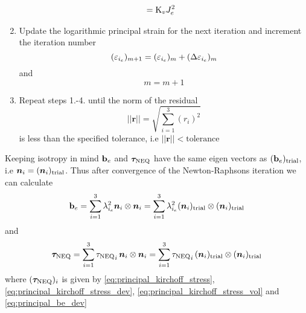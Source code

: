 \begin{enumerate}
\begin{align}
        &= \mathrm{K}_{v} J_{e}^{2} \label{eq:diff_prtauneqvol}
    \end{align}
    \item Update the logarithmic principal strain for the next iteration and increment the iteration number
    \begin{equation}
        (\varepsilon_{{i}_e})_{m+1} = (\varepsilon_{{i}_e})_{m} + (\Delta \varepsilon_{{i}_e})_{m}
        \label{eq:strain_update_neq}
    \end{equation}
    and 
    \begin{equation}
        m = m+1
    \end{equation}
    \item Repeat steps 1.-4. until the norm of the residual
    \begin{equation}
        || \bm{r} || = \sqrt{\sum_{i=1}^{3} (r_{i})^{2}}
        \label{eq:residual_norm} 
    \end{equation}
    is less than the specified tolerance, i.e \(|| \bm{r} || < \text{tolerance}\)
\end{enumerate}

Keeping isotropy in mind \(\mathbf{b}_{e}\) and \(\bm{\tau}_{\text{NEQ}}\) have the same eigen vectors as \(({\mathbf{b}_{e}})_\text{trial}\), i.e \(\bm{n}_{i} = ({\bm{n}_{i}})_\text{trial}\). Thus after convergence of the Newton-Raphsons iteration we can calculate
\begin{equation}
    \mathbf{b}_{e} 
    = \sum_{i=1}^{3} \lambda^{2}_{{i}_e} \bm{n}_{i} \otimes \bm{n}_{i}
    = \sum_{i=1}^{3} \lambda^{2}_{{i}_e} ({\bm{n}_{i}})_\text{trial} \otimes ({\bm{n}_{i}})_\text{trial} 
    \label{eq:def_be}
\end{equation}
and 
\begin{equation}
    \bm{\tau}_{\text{NEQ}} = 
    \sum_{i=1}^{3} {{\tau}_{\text{NEQ}}}_{i} \, \bm{n}_{i} \otimes \bm{n}_{i}
    = \sum_{i=1}^{3} {{\tau}_{\text{NEQ}}}_{i} \, ({\bm{n}_{i}})_\text{trial} \otimes ({\bm{n}_{i}})_\text{trial}
    \label{eq:tauneq} 
\end{equation}
where \((\bm{\tau}_{\text{NEQ}})_i\) is given by \cref{eq:principal_kirchoff_stress}, \cref{eq:principal_kirchoff_stress_dev}, \cref{eq:principal_kirchoff_stress_vol} and \cref{eq:principal_be_dev}
